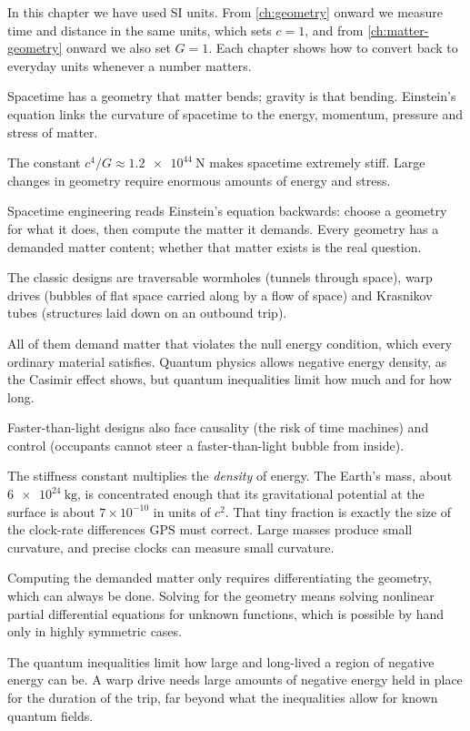 In this chapter we have used SI units. From \cref{ch:geometry} onward we
measure time and distance in the same units, which sets $c = 1$, and from
\cref{ch:matter-geometry} onward we also set $G = 1$. Each chapter shows how to
convert back to everyday units whenever a number matters.

\begin{chaptersummary}
\item Spacetime has a geometry that matter bends; gravity is that bending.
  Einstein's equation links the curvature of spacetime to the energy,
  momentum, pressure and stress of matter.
\item The constant $c^{4}/G \approx \SI{1.2e44}{\newton}$ makes spacetime
  extremely stiff. Large changes in geometry require enormous amounts of
  energy and stress.
\item Spacetime engineering reads Einstein's equation backwards: choose a
  geometry for what it does, then compute the matter it demands. Every
  geometry has a demanded matter content; whether that matter exists is the
  real question.
\item The classic designs are traversable wormholes (tunnels through space),
  warp drives (bubbles of flat space carried along by a flow of space) and
  Krasnikov tubes (structures laid down on an outbound trip).
\item All of them demand matter that violates the null energy condition,
  which every ordinary material satisfies. Quantum physics allows negative
  energy density, as the Casimir effect shows, but quantum inequalities limit
  how much and for how long.
\item Faster-than-light designs also face causality (the risk of time
  machines) and control (occupants cannot steer a faster-than-light bubble
  from inside).
\end{chaptersummary}

\begin{checkanswers}
\item[1.1] The stiffness constant multiplies the \emph{density} of energy.
  The Earth's mass, about $\SI{6e24}{\kilogram}$, is concentrated enough that
  its gravitational potential at the surface is about $7\times10^{-10}$ in
  units of $c^{2}$. That tiny fraction is exactly the size of the clock-rate
  differences GPS must correct. Large masses produce small curvature, and
  precise clocks can measure small curvature.
\item[1.2] Computing the demanded matter only requires differentiating the
  geometry, which can always be done. Solving for the geometry means solving
  nonlinear partial differential equations for unknown functions, which is
  possible by hand only in highly symmetric cases.
\item[1.3] The quantum inequalities limit how large and long-lived a region of
  negative energy can be. A warp drive needs large amounts of negative energy
  held in place for the duration of the trip, far beyond what the
  inequalities allow for known quantum fields.
\end{checkanswers}

